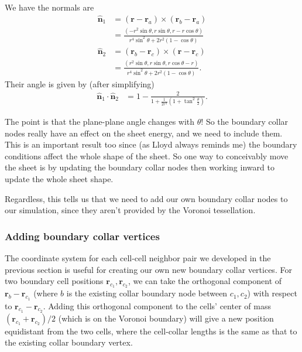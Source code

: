 \documentclass[draft]{article}
\begin{document}
We have the normals are 
\begin{align*}
    \hat{\bm{n}}_1 &= (\bm{r} - \bm{r}_a) \times (\bm{r}_b - \bm{r}_a) \\
    &= \frac{(-r^2 \sin\theta, r\sin\theta, r - r\cos\theta)}{r^4\sin^2\theta + 2r^2(1-\cos\theta)} \\
    \hat{\bm{n}}_2 &= (\bm{r}_b - \bm{r}_c) \times (\bm{r} - \bm{r}_c)\\
    &= \frac{(r^2 \sin\theta, r\sin\theta, r\cos\theta - r)}{r^4\sin^2\theta + 2r^2(1-\cos\theta)}.
\end{align*}
\noindent Their angle is given by (after simplifying)
\begin{align*}
    \hat{\bm{n}}_1 \cdot \hat{\bm{n}}_2 &= 1 - \frac{2}{1 + \frac{1}{2r^2} \left(1+\tan^2\frac{\theta}{2}\right)}.
\end{align*}

The point is that the plane-plane angle changes with $\theta$! So the boundary collar nodes really have an effect on the sheet energy, and we need to include them. This is an important result too since (as Lloyd always reminds me) the boundary conditions affect the whole shape of the sheet. So one way to conceivably move the sheet is by updating the boundary collar nodes then working inward to update the whole sheet shape. 

Regardless, this tells us that we need to add our own boundary collar nodes to our simulation, since they aren't provided by the Voronoi tessellation.

\subsubsection{Adding boundary collar vertices}

The coordinate system for each cell-cell neighbor pair we developed in the previous section is useful for creating our own new boundary collar vertices. For two boundary cell positions $\bm{r}_{c_1}, \bm{r}_{c_2}$, we can take the orthogonal component of $\bm{r}_{b} - \bm{r}_{c_1}$ (where $b$ is the existing collar boundary node between $c_1, c_2$) with respect to $\bm{r}_{c_1} - \bm{r}_{c_2}$. Adding this orthogonal component to the cells' center of mass $(\bm{r}_{c_1} + \bm{r}_{c_2})/2$ (which is on the Voronoi boundary) will give a new position equidistant from the two cells, where the cell-collar lengths is the same as that to the existing collar boundary vertex. 
\end{document}
